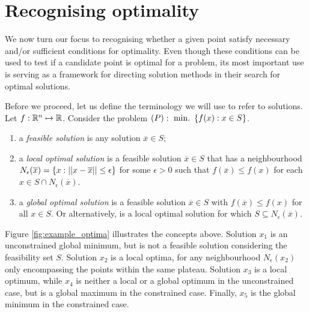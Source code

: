 \section{Recognising optimality}

We now turn our focus to recognising whether a given point satisfy necessary and/or sufficient conditions for optimality. Even though these conditions can be used to test if a candidate point is optimal for a problem, its most important use is serving as a framework for directing solution methods in their search for optimal solutions. 

Before we proceed, let us define the terminology we will use to refer to solutions. Let $f:\mathbb{R}^n \mapsto \mathbb{R}$. Consider the problem
$(P) :~ \mathop{\text{min.~}}\left\{ f(x) : x \in S \right \}$.
% 
\begin{enumerate}
\item a \emph{feasible solution} is any solution  $\overline{x} \in S$;
\item a \emph{local optimal solution} is a feasible solution $\overline{x}\in S$ that has a neighbourhood $N_\epsilon(\overline{x}) = \left\{ x : ||x - \overline{x}|| \leq \epsilon \right \}$ for some $\epsilon >0$ such that $f(\overline{x}) \leq f(x)$ for each $x \in S \cap N_\epsilon(\overline{x})$.
\item a \emph{global optimal solution} is a feasible solution $\overline{x} \in S$ with $f(\overline{x}) \leq f(x)$ for all $x \in S$. Or alternatively, is a local optimal solution for which $S \subseteq N_\epsilon(\overline{x})$.
\end{enumerate}
%
Figure \ref{fig:example_optima} illustrates the concepts above. Solution $x_1$ is an unconstrained global minimum, but is not a feasible solution considering the feasibility set $S$. Solution $x_2$ is a local optima, for any neighbourhood $N_\epsilon(x_2)$ only encompassing the points within the same plateau. Solution $x_3$ is a local optimum, while $x_4$ is neither a local or a global optimum in the unconstrained case, but is a global maximum in the constrained case. Finally, $x_5$ is the global minimum in the constrained case.


